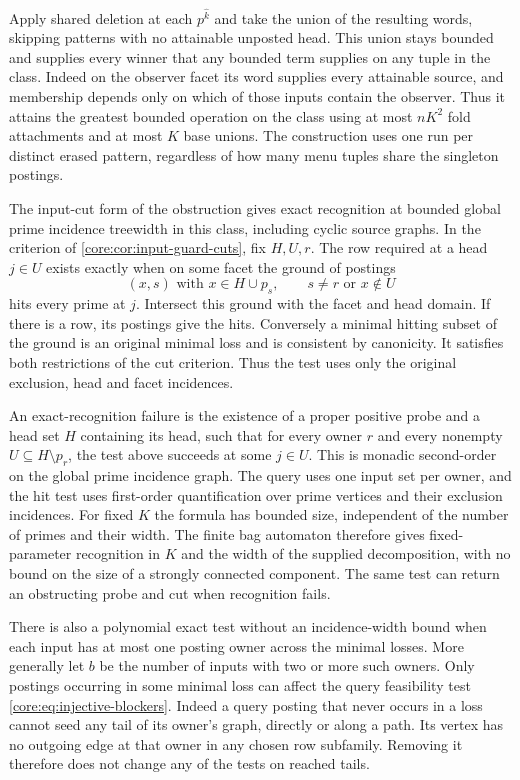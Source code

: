Apply shared deletion at each $p^{\widehat k}$ and
take the union of the resulting words, skipping
patterns with no attainable unposted head. This
union stays bounded and supplies every winner that
any bounded term supplies on any tuple in the
class. Indeed on the observer facet its word
supplies every attainable source, and membership
depends only on which of those inputs contain
the observer. Thus it attains the greatest bounded
operation on the class using at most $nK^2$ fold
attachments and at most $K$ base unions. The
construction uses one run per distinct erased
pattern, regardless of how many menu tuples
share the singleton postings.

The input-cut form of the obstruction gives exact
recognition at bounded global prime incidence treewidth
in this class, including cyclic source graphs. In the
criterion of \cref{core:cor:input-guard-cuts}, fix
$H,U,r$. The row required at a head $j\in U$ exists
exactly when on some facet the ground of postings
\[
 (x,s)\text{ with }x\in H\cup p_s,\qquad
               s\ne r\text{ or }x\notin U
\]
hits every prime at $j$. Intersect this ground with
the facet and head domain. If there is a row, its
postings give the hits. Conversely a minimal hitting
subset of the ground is an original minimal loss
and is consistent by canonicity. It satisfies both
restrictions of the cut criterion. Thus the test uses
only the original exclusion, head and facet incidences.

An exact-recognition failure is the existence of a
proper positive probe and a head set $H$ containing
its head, such that for every owner $r$ and every
nonempty $U\subseteq H\setminus p_r$, the test above
succeeds at some $j\in U$. This is monadic second-order
on the global prime incidence graph. The query uses
one input set per owner, and the hit test uses first-order
quantification over prime vertices and their exclusion
incidences. For fixed $K$ the formula has bounded size,
independent of the number of primes and their width.
The finite bag automaton therefore gives fixed-parameter
recognition in $K$ and the width of the supplied
decomposition, with no bound on the size of a strongly
connected component. The same test can return an
obstructing probe and cut when recognition fails.

There is also a polynomial exact test without an
incidence-width bound when each input has at most one
posting owner across the minimal losses. More generally
let $b$ be the number of inputs with two or more such
owners. Only postings occurring in some minimal loss
can affect the query feasibility test
\cref{core:eq:injective-blockers}. Indeed a query posting
that never occurs in a loss cannot seed any tail of its
owner's graph, directly or along a path. Its vertex has
no outgoing edge at that owner in any chosen row
subfamily. Removing it therefore does not change any
of the tests on reached tails.

